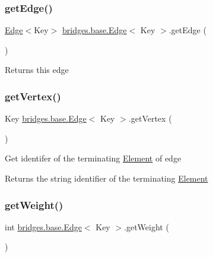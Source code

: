 \subsubsection{\texorpdfstring{get\+Edge()}{getEdge()}}
{\footnotesize\ttfamily \hyperlink{classbridges_1_1base_1_1_edge}{Edge}$<$Key$>$ \hyperlink{classbridges_1_1base_1_1_edge}{bridges.\+base.\+Edge}$<$ Key $>$.get\+Edge (\begin{DoxyParamCaption}{ }\end{DoxyParamCaption})}

Returns this edge \hypertarget{classbridges_1_1base_1_1_edge_ada8056d4944cfea69f438af8274c1f79}{}\label{classbridges_1_1base_1_1_edge_ada8056d4944cfea69f438af8274c1f79} 
\subsubsection{\texorpdfstring{get\+Vertex()}{getVertex()}}
{\footnotesize\ttfamily Key \hyperlink{classbridges_1_1base_1_1_edge}{bridges.\+base.\+Edge}$<$ Key $>$.get\+Vertex (\begin{DoxyParamCaption}{ }\end{DoxyParamCaption})}

Get identifer of the terminating \hyperlink{classbridges_1_1base_1_1_element}{Element} of edge

\begin{DoxyReturn}{Returns}
the string identifier of the terminating \hyperlink{classbridges_1_1base_1_1_element}{Element} 
\end{DoxyReturn}
\hypertarget{classbridges_1_1base_1_1_edge_a4cc9219e5842cafb7c5891ba15147ec1}{}\label{classbridges_1_1base_1_1_edge_a4cc9219e5842cafb7c5891ba15147ec1} 
\subsubsection{\texorpdfstring{get\+Weight()}{getWeight()}}
{\footnotesize\ttfamily int \hyperlink{classbridges_1_1base_1_1_edge}{bridges.\+base.\+Edge}$<$ Key $>$.get\+Weight (\begin{DoxyParamCaption}{ }\end{DoxyParamCaption})}

